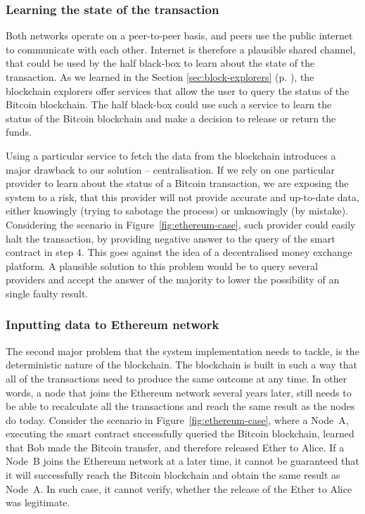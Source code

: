 \subsubsection{Learning the state of the transaction}
Both networks operate on a peer-to-peer basis, and peers use the public internet to communicate with each other. Internet is therefore a plausible shared channel, that could be used by the half black-box to learn about the state of the transaction. As we learned in the Section \ref{sec:block-explorers} (p. \pageref{sec:block-explorers}), the blockchain explorers offer services that allow the user to query the status of the Bitcoin blockchain. The half black-box could use such a service to learn the status of the Bitcoin blockchain and make a decision to release or return the funds.

Using a particular service to fetch the data from the blockchain introduces a major drawback to our solution -- centralisation. If we rely on one particular provider to learn about the status of a Bitcoin transaction, we are exposing the system to a risk, that this provider will not provide accurate and up-to-date data, either knowingly (trying to sabotage the process) or unknowingly (by mistake). Considering the scenario in Figure~\ref{fig:ethereum-case}, such provider could easily halt the transaction, by providing negative answer to the query of the smart contract in step 4. This goes against the idea of a decentralised money exchange platform. A plausible solution to this problem would be to query several providers and accept the answer of the majority to lower the possibility of an single faulty result.

\subsubsection{Inputting data to Ethereum network}\label{sec:data-input}
The second major problem that the system implementation needs to tackle, is the deterministic nature of the blockchain. The blockchain is built in such a way that all of the transactions need to produce the same outcome at any time. In other words, a node that joins the Ethereum network several years later, still needs to be able to recalculate all the transactions and reach the same result as the nodes do today. Consider the scenario in Figure~\ref{fig:ethereum-case}, where a Node~A, executing the smart contract successfully queried the Bitcoin blockchain, learned that Bob made the Bitcoin transfer, and therefore released Ether to Alice. If a Node~B joins the Ethereum network at a later time, it cannot be guaranteed that it will successfully reach the Bitcoin blockchain and obtain the same result as Node~A. In such case, it cannot verify, whether the release of the Ether to Alice was legitimate.

